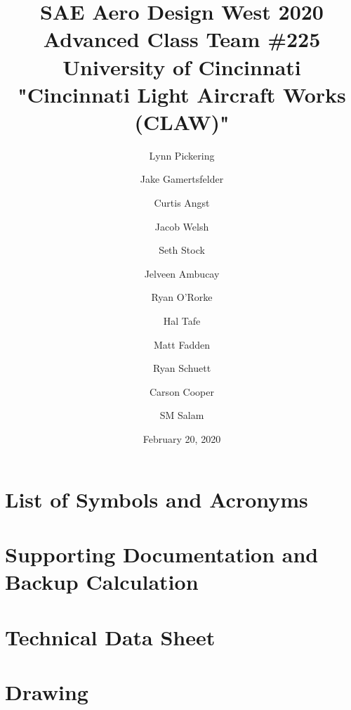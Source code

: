 \documentclass[12pt, letterpaper]{article}
\title{SAE Aero Design West 2020 Advanced Class Team \#225\\
	\large University of Cincinnati "Cincinnati Light Aircraft Works (CLAW)"}
\author{
		Lynn Pickering
	\and
		Jake Gamertsfelder
	\and
		Curtis Angst
	\and
		Jacob Welsh
	\and
		Seth Stock
	\and
		Jelveen Ambucay
	\and
		Ryan O'Rorke
	\and
		Hal Tafe
	\and
		Matt Fadden
	\and
		Ryan Schuett
	\and
		Carson Cooper
	\and
		SM Salam}
\date{February 20, 2020}
\begin{document}
	\begin{titlepage}
		\maketitle
	\end{titlepage}
	\listoffigures
	\tableofcontents
	\newpage
	
	
	
	
	
	
	
	
	
	
	
	
	\begin{appendices}
		\section{List of Symbols and Acronyms}
		\section{Supporting Documentation and Backup Calculation}
		\section{Technical Data Sheet}
		\section{Drawing}
	\end{appendices}
	
\end{document}
